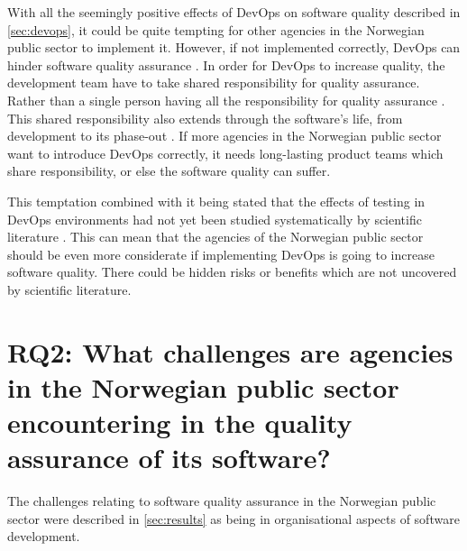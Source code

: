 With all the seemingly positive effects of DevOps on software quality described in \autoref{sec:devops}, it could be quite tempting for other agencies in the Norwegian public sector to implement it. However, if not implemented correctly, DevOps can hinder software quality assurance \cite{dsc_2019}. In order for DevOps to increase quality, the development team have to take shared responsibility for quality assurance. Rather than a single person having all the responsibility for quality assurance \cite{dsc_2019}. This shared responsibility also extends through the software's life, from development to its phase-out \cite{dsc_2019}. If more agencies in the Norwegian public sector want to introduce DevOps correctly, it needs long-lasting product teams which share responsibility, or else the software quality can suffer.


This temptation combined with it being stated that the effects of testing in DevOps environments had not yet been studied systematically by scientific literature \cite{dsc_2019}\cite{ja_2016}. This can mean that the agencies of the Norwegian public sector should be even more considerate if implementing DevOps is going to increase software quality. There could be hidden risks or benefits which are not uncovered by scientific literature.


\section{RQ2: What challenges are agencies in the Norwegian public sector encountering in the quality assurance of its software?}
The challenges relating to software quality assurance in the Norwegian public sector were described in \autoref{sec:results} as being in organisational aspects of software development.

